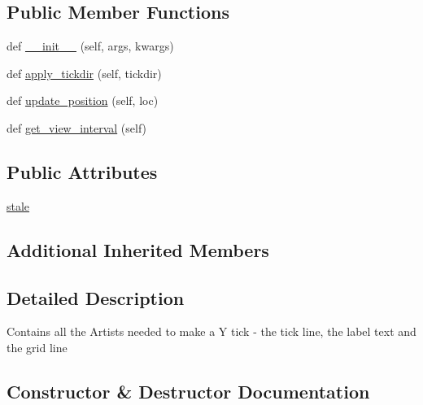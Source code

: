 \subsection*{Public Member Functions}
\begin{DoxyCompactItemize}
\item 
def \hyperlink{classmatplotlib_1_1axis_1_1YTick_a42fb4e1e12d7fcbbd708dbf5738a66a8}{\+\_\+\+\_\+init\+\_\+\+\_\+} (self, args, kwargs)
\item 
def \hyperlink{classmatplotlib_1_1axis_1_1YTick_a512df12a1774ab529d316c1845598899}{apply\+\_\+tickdir} (self, tickdir)
\item 
def \hyperlink{classmatplotlib_1_1axis_1_1YTick_a72a8e2fcc51ff4fbc7a5dae9688cc78c}{update\+\_\+position} (self, loc)
\item 
def \hyperlink{classmatplotlib_1_1axis_1_1YTick_a81b24aa79c8d43189f7d86c11c3ecdb0}{get\+\_\+view\+\_\+interval} (self)
\end{DoxyCompactItemize}
\subsection*{Public Attributes}
\begin{DoxyCompactItemize}
\item 
\hyperlink{classmatplotlib_1_1axis_1_1YTick_a0fe121f862ae76f2d9d81fed845e12e2}{stale}
\end{DoxyCompactItemize}
\subsection*{Additional Inherited Members}


\subsection{Detailed Description}
\begin{DoxyVerb}Contains all the Artists needed to make a Y tick - the tick line,
the label text and the grid line
\end{DoxyVerb}
 

\subsection{Constructor \& Destructor Documentation}
\mbox{\label{classmatplotlib_1_1axis_1_1YTick_a42fb4e1e12d7fcbbd708dbf5738a66a8}} 
